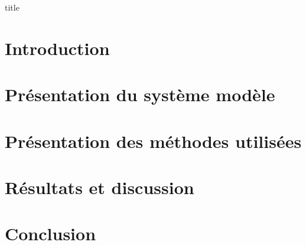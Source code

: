 \documentclass[a4paper, 11pt]{article}
\begin{document}
    {title}
\clearpage


\tableofcontents
\thispagestyle{empty}
\clearpage


\setcounter{page}{1}
\section*{Introduction}

    
\clearpage


\section{Présentation du système modèle}

    

\section{Présentation des méthodes utilisées}


\section{Résultats et discussion}


\section{Conclusion}
\end{document}
